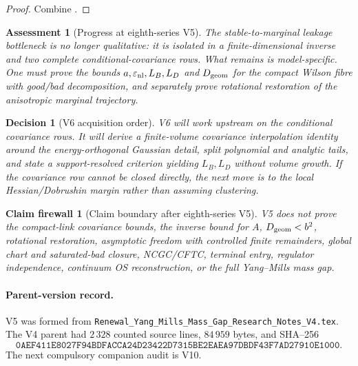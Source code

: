 \documentclass[11pt,oneside]{book}
\newtheorem{assessment}[theorem]{Assessment}
\newtheorem{firewall}[theorem]{Claim firewall}
\newtheorem{decision}[theorem]{Decision}
\theoremstyle{definition}
\theoremstyle{remark}
\begin{document}
\begin{proof}
Combine
.
\end{proof}

\begin{assessment}[Progress at eighth-series V5]
\label{ass:e8v5-status}
The stable-to-marginal leakage bottleneck is no longer qualitative:
it is isolated in a finite-dimensional inverse and two complete
conditional-covariance rows.  What remains is model-specific.  One
must prove the bounds \(a,\varepsilon_{\rm nl},L_B,L_D\) and
\(D_{\rm geom}\) for the compact Wilson fibre with good/bad
decomposition, and separately prove rotational restoration of the
anisotropic marginal trajectory.
\end{assessment}

\begin{decision}[V6 acquisition order]
\label{dec:e8v5-V6}
V6 will work upstream on the conditional covariance rows.  It will
derive a finite-volume covariance interpolation identity around the
energy-orthogonal Gaussian detail, split polynomial and analytic
tails, and state a support-resolved criterion yielding
\(L_B,L_D\) without volume growth.  If the covariance row cannot be
closed directly, the next move is to the local Hessian/Dobrushin
margin rather than assuming clustering.
\end{decision}

\begin{firewall}[Claim boundary after eighth-series V5]
\label{fire:e8v5-claim}
V5 does not prove the compact-link covariance bounds, the inverse
bound for \(A\), \(D_{\rm geom}<b^2\), rotational restoration,
asymptotic freedom with controlled finite remainders, global chart
and saturated-bad closure, NCGC/CFTC, terminal entry, regulator
independence, continuum OS reconstruction, or the full Yang--Mills
mass gap.
\end{firewall}

\paragraph{Parent-version record.}
V5 was formed from
\texttt{Renewal\_Yang\_Mills\_Mass\_Gap\_Research\_Notes\_V4.tex}.
The V4 parent had \(2\,328\) counted source lines,
\(84\,959\) bytes, and SHA--256
\[
\texttt{0AEF411E8027F94BDFACCA24D23422D7315BE2EAEA97DBDF43F7AD27910E1000}.
\]
The next compulsory companion audit is V10.
\end{document}
